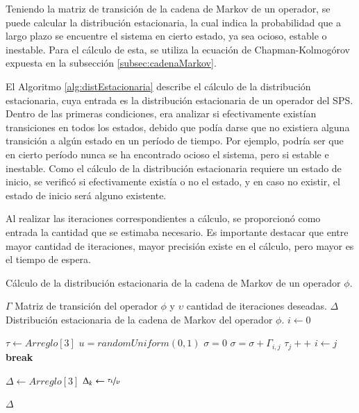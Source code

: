 Teniendo la matriz de transición de la cadena de Markov de un operador, se puede calcular la distribución estacionaria, la cual indica la probabilidad que a largo plazo se encuentre el sistema en cierto estado, ya sea ocioso, estable o inestable. Para el cálculo de esta, se utiliza la ecuación de Chapman-Kolmogórov \citep{Papoulis1984} expuesta en la subsección \ref{subsec:cadenaMarkov}.

El Algoritmo \ref{alg:distEstacionaria} describe el cálculo de la distribución estacionaria, cuya entrada es la distribución estacionaria de un operador del SPS. Dentro de las primeras condiciones, era analizar si efectivamente existían transiciones en todos los estados, debido que podía darse que no existiera alguna transición a algún estado en un período de tiempo. Por ejemplo, podría ser que en cierto período nunca se ha encontrado ocioso el sistema, pero si estable e inestable. Como el cálculo de la distribución estacionaria requiere un estado de inicio, se verificó si efectivamente existía o no el estado, y en caso no existir, el estado de inicio será alguno existente.

Al realizar las iteraciones correspondientes a cálculo, se proporcionó como entrada la cantidad que se estimaba necesario. Es importante destacar que entre mayor cantidad de iteraciones, mayor precisión existe en el cálculo, pero mayor es el tiempo de espera.

\begin{algorithm}[!ht]
	\caption{Cálculo de la distribución estacionaria de la cadena de Markov de un operador $\phi$.}
	\label{alg:distEstacionaria}
	\begin{algorithmic}[1]
	\REQUIRE $\Gamma$ Matriz de transición del operador $\phi$ y $\upsilon$ cantidad de iteraciones deseadas.
	\ENSURE $\Delta$ Distribución estacionaria de la cadena de Markov del operador $\phi$.
	\STATE $i \leftarrow 0$ 
		\ENDIF
	\ENDFOR
	
	\STATE $\tau \leftarrow Arreglo[3]$ 
		\STATE $u = randomUniform(0,1)$
		\STATE $\sigma = 0$
			\STATE $\sigma = \sigma + \Gamma_{i,j}$
				\STATE $\tau_{j}++$
				\STATE $i \leftarrow j$
				\STATE \textbf{break}
			\ENDIF
		\ENDFOR
	\ENDFOR

	\STATE $\Delta \leftarrow Arreglo[3]$ 
		\STATE $\Delta_{k} \leftarrow \nicefrac{\tau_{k}}{\upsilon}$
	\ENDFOR	
	
	\RETURN $\Delta$
	
	\end{algorithmic}
\end{algorithm}

